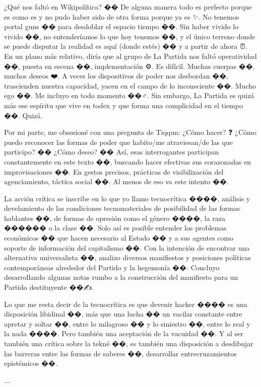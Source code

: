 ¿Qué nos faltó en Wikipolítica? �� De alguna manera todo es perfecto porque es como es y no pudo haber sido de otra forma porque ya es ✨. No tenemos portal guns �� para desdoblar el espacio tiempo ��. Sin haber vivido lo vivido ��, no entenderíamos lo que hoy tenemos ��, y el único terreno donde se puede disputar la realidad es aquí (donde estés) �� y a partir de ahora ⏰. En un plano más relativo, diría que al grupo de La Partida nos faltó operatividad ��️, puesta en escena ��, implementación ⚙️. Es difícil. Muchas cuerpas ��, muchos deseos ❤️. A veces los dispositivos de poder nos desbordan ��, trascienden nuestra capacidad, yacen en el campo de lo inconsciente ��. Mucho ego ��. Me incluyo en todo momento ��‍♂️. Sin embargo, La Partida es quizá más ese espíritu que vive en todex y que forma una complicidad en el tiempo ��. Quizá.

Por mi parte, me obsesioné con una pregunta de Tiqqun: ¿Cómo hacer? ❓
¿Cómo puedo reconocer las formas de poder que habito/me atraviesan/de las que participo? �� ¿Cómo deseo? �� Así, esas interrogantes participan constantemente en este texto ��, buscando hacer efectivas sus corazonadas en improvisaciones ��. En gestos precisos, prácticas de visibilización del agenciamiento, táctica social ��️.
Al menos de eso va este intento ��.

La acción crítica se inscribe en lo que yo llamo tecnocrítica ����, análisis y develamiento de las condiciones tecnomateriales de posibilidad de las formas hablantes ��️, de formas de opresión como el género ��‍��, la raza ����‍�� o la clase ��. Solo así es posible entender los problemas económicos �� que hacen necesario al Estado ��️ y a sus agentes como soporte de información del capitalismo ��. Con la intención de encontrar una alternativa universalista ��, analizo diversos manifiestos y posiciones políticas contemporáneas alrededor del Partido y la hegemonía ��. Concluyo desarrollando algunas notas rumbo a la construcción del manifiesto para un Partido destituyente ��✍️.

Lo que me resta decir de la tecnocrítica es que devenir hacker ��️�� es una disposición libidinal ��, más que una lucha �� un vacilar constante entre apretar y soltar ��, entre lo milagroso �� y lo siniestro ��, entre lo real y la nada ����️. Pero también una aceptación de la vacuidad ��. Y al ser también una crítica sobre la tekné ��, es también una disposición a desdibujar las barreras entre las formas de saberes ��, desarrollar entrecruzamientos epistémicos ��️.

...

